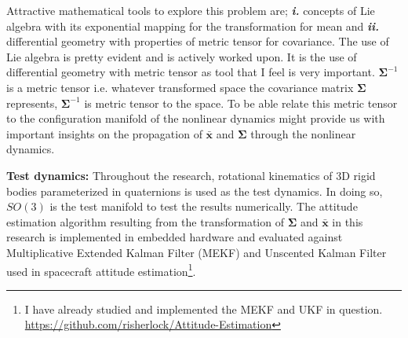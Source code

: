 \documentclass[12pt]{article}
\begin{document}
\noindent
Attractive mathematical tools to explore this problem are; \textbf{\textit{i.}} concepts of Lie algebra with its exponential mapping for the transformation for mean and \textbf{\textit{ii.}} differential geometry with properties of metric tensor for covariance. The use of Lie algebra is pretty evident and is actively worked upon. It is the use of differential geometry with metric tensor as tool that I feel is very important. $\bm{\Sigma}^{-1}$ is a metric tensor i.e. whatever transformed space the covariance matrix $\bm{\Sigma}$ represents, $\bm{\Sigma}^{-1}$ is metric tensor to the space. To be able relate this metric tensor to the configuration manifold of the nonlinear dynamics might provide us with important insights on the propagation of $\bar{\bm{x}}$ and $\bm{\Sigma}$ through the nonlinear dynamics. \medskip

\noindent 
\textbf{Test dynamics: } Throughout the research, rotational kinematics of 3D rigid bodies parameterized in quaternions is used as the test dynamics. In doing so, $SO(3)$ is the test manifold to test the results numerically. The attitude estimation algorithm resulting from the transformation of $\bm{\Sigma}$ and $\bar{\bm{x}}$ in this research is implemented in embedded hardware and evaluated against Multiplicative Extended Kalman Filter (MEKF) and Unscented Kalman Filter used in spacecraft attitude estimation\footnote{I have already studied and implemented the MEKF and UKF in question. \href{https://github.com/risherlock/Attitude-Estimation}{https://github.com/risherlock/Attitude-Estimation}}. 
\end{document}
